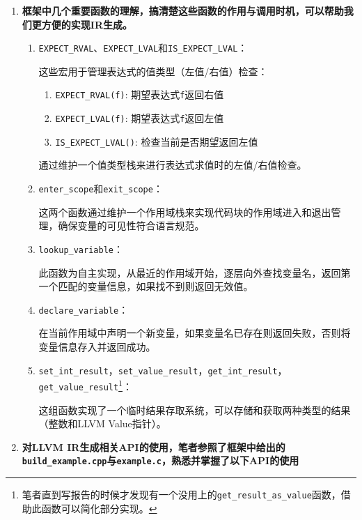 \documentclass[../main.tex]{subfiles}
\begin{document}
\begin{enumerate}
	\item \textbf{框架中几个重要函数的理解，搞清楚这些函数的作用与调用时机，可以帮助我们更方便的实现IR生成。}
	      \begin{enumerate}
		      \item \texttt{EXPECT\_RVAL}、\texttt{EXPECT\_LVAL}和\texttt{IS\_EXPECT\_LVAL}：

		            这些宏用于管理表达式的值类型（左值/右值）检查：
		            \begin{enumerate}
			            \item \texttt{EXPECT\_RVAL(f)}: 期望表达式\texttt{f}返回右值
			            \item \texttt{EXPECT\_LVAL(f)}: 期望表达式\texttt{f}返回左值
			            \item \texttt{IS\_EXPECT\_LVAL()}: 检查当前是否期望返回左值
		            \end{enumerate}

		            通过维护一个值类型栈来进行表达式求值时的左值/右值检查。

		      \item \texttt{enter\_scope}和\texttt{exit\_scope}：

		            这两个函数通过维护一个作用域栈来实现代码块的作用域进入和退出管理，确保变量的可见性符合语言规范。

		      \item \texttt{lookup\_variable}：

		            此函数为自主实现，从最近的作用域开始，逐层向外查找变量名，返回第一个匹配的变量信息，如果找不到则返回无效值。
		      \item \texttt{declare\_variable}：

		            在当前作用域中声明一个新变量，如果变量名已存在则返回失败，否则将变量信息存入并返回成功。
		      \item \texttt{set\_int\_result}，\texttt{set\_value\_result}，\texttt{get\_int\_result}，\texttt{get\_value\_result}\footnote{笔者直到写报告的时候才发现有一个没用上的\texttt{get\_result\_as\_value}函数，借助此函数可以简化部分实现。}：

		            这组函数实现了一个临时结果存取系统，可以存储和获取两种类型的结果（整数和LLVM Value指针）。
	      \end{enumerate}
	\item \textbf{对LLVM IR生成相关API的使用，笔者参照了框架中给出的\texttt{build\_example.cpp}与\texttt{example.c}，熟悉并掌握了以下API的使用}


\end{enumerate}
\end{document}
